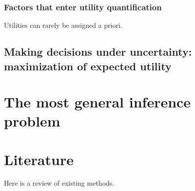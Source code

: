 \documentclass[]{book}
\begin{document}
\hypertarget{factors-that-enter-utility-quantification}{%
\subsection{Factors that enter utility quantification}\label{factors-that-enter-utility-quantification}}

Utilities can rarely be assigned a priori.

\hypertarget{making-decisions-under-uncertainty-maximization-of-expected-utility}{%
\section{Making decisions under uncertainty: maximization of expected utility}\label{making-decisions-under-uncertainty-maximization-of-expected-utility}}

\hypertarget{the-most-general-inference-problem}{%
\chapter{The most general inference problem}\label{the-most-general-inference-problem}}

\hypertarget{literature}{%
\chapter{Literature}\label{literature}}

Here is a review of existing methods.


\end{document}
